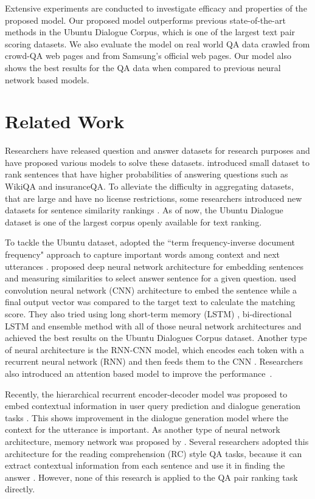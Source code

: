 \documentclass[11pt,a4paper]{article}
\begin{document}
Extensive experiments are conducted to investigate efficacy and properties of the proposed model.
Our proposed model outperforms previous state-of-the-art methods in the Ubuntu Dialogue Corpus, which is one of the largest text pair scoring datasets.
We also evaluate the model on real world QA data crawled from crowd-QA web pages and from Samsung's official web pages. 
Our model also shows the best results for the QA data when compared to previous neural network based models.


\section{Related Work}
\label{realtedword}
Researchers have released question and answer datasets for research purposes and have proposed various models to solve these datasets. \cite{wang2007jeopardy,yang2015wikiqa,tan2015lstm} introduced small dataset to rank sentences that have higher probabilities of answering questions such as  WikiQA and insuranceQA.
To alleviate the difficulty in aggregating datasets, that are large and have no license restrictions, some researchers introduced new datasets for sentence similarity rankings \cite{baudivs2016sentence,lowe2015ubuntu}. As of now, the Ubuntu Dialogue dataset is one of the largest corpus openly available for text ranking.

To tackle the Ubuntu dataset, \cite{lowe2015ubuntu} adopted the ``term frequency-inverse document frequency" approach to capture important words among context and next utterances \cite{ramos2003using}. \cite{bordes2014open,yu2014deep} proposed deep neural network architecture for embedding sentences and measuring similarities to select answer sentence for a given question. \cite{kadlec2015improved} used convolution neural network (CNN) architecture to embed the sentence while a final output vector was compared to the target text to calculate the matching score. They also tried using long short-term memory (LSTM) \cite{hochreiter1997long}, bi-directional LSTM and ensemble method with all of those neural network architectures and achieved the best results on the Ubuntu Dialogues Corpus dataset. 
Another type of neural architecture is the RNN-CNN model, which encodes each token with a recurrent neural network (RNN) and then feeds them to the CNN \cite{baudivs2016sentence}. 
Researchers also introduced an attention based model to improve the performance~\cite{tan2015lstm,wang2016compare,wang2017bilateral}. 

Recently, the hierarchical recurrent encoder-decoder model was proposed to embed contextual information in user query prediction and dialogue generation tasks \cite{sordoni2015hierarchical,serban2016building}.
This shows improvement in the dialogue generation model where the context for the utterance is important.
As another type of neural network architecture, memory network was proposed by \cite{sukhbaatar2015end}. Several researchers adopted this architecture for the reading comprehension (RC) style QA tasks, because it can extract contextual information from each sentence and use it in finding the answer \cite{xiong2016dynamic,kumar2016ask}.  However, none of this research is applied to the QA pair ranking task directly.
\end{document}
